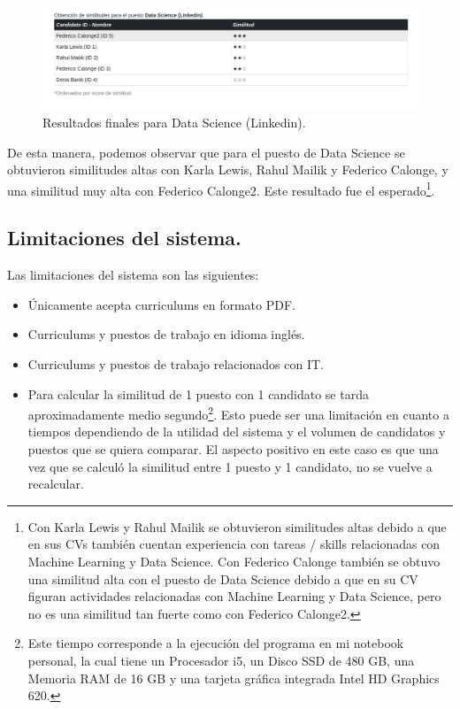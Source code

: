 \documentclass[12pt,a4paper]{article}
\begin{document}
\begin{sloppypar}
\begin{figure}[H]    %
 \centering
 \includegraphics[width=1\textwidth]{images/implementacion_web/caso_uso_paso_4_2.png}
 \caption{Resultados finales para Data Science (Linkedin).} 
 \label{fig:caso_uso_paso_4_2}
\end{figure}

De esta manera, podemos observar que para el puesto de Data Science se obtuvieron similitudes altas con Karla Lewis, Rahul Mailik y Federico Calonge, y una similitud muy alta con Federico Calonge2. Este resultado fue el esperado\footnote{Con Karla Lewis y Rahul Mailik se obtuvieron similitudes altas debido a que en sus CVs también cuentan experiencia con tareas / skills relacionadas con Machine Learning y Data Science. Con Federico Calonge también se obtuvo una similitud alta con el puesto de Data Science debido a que en su CV figuran actividades relacionadas con Machine Learning y Data Science, pero no es una similitud tan fuerte como con Federico Calonge2.}.

\cleardoublepage

\subsection{Limitaciones del sistema.}\label{limitacionessistema}
Las limitaciones del sistema son las siguientes:
\begin{itemize}
\item Únicamente acepta curriculums en formato PDF.
\item Curriculums y puestos de trabajo en idioma inglés.
\item Curriculums y puestos de trabajo relacionados con IT.
\item Para calcular la similitud de 1 puesto con 1 candidato se tarda aproximadamente medio segundo\footnote{Este tiempo corresponde a la ejecución del programa en mi notebook personal, la cual tiene un Procesador i5, un Disco SSD de 480 GB, una Memoria RAM de 16 GB y una tarjeta gráfica integrada Intel HD Graphics 620.}. Esto puede ser una limitación en cuanto a tiempos dependiendo de la utilidad del sistema y el volumen de candidatos y puestos que se quiera comparar. El aspecto positivo en este caso es que una vez que se calculó la similitud entre 1 puesto y 1 candidato, no se vuelve a recalcular. 
\end{itemize}


\end{sloppypar}
\end{document}
